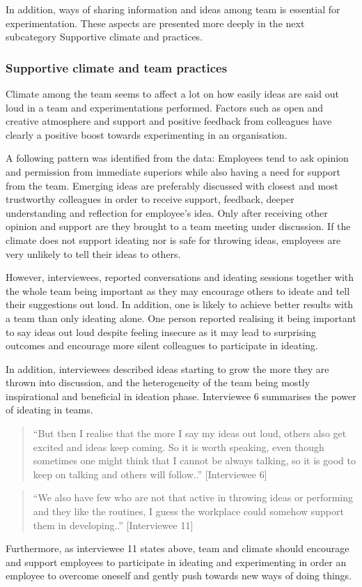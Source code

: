 In addition, ways of sharing information and ideas among team is essential for experimentation. These aspects are presented more deeply in the next subcategory Supportive climate and practices. 


\subsubsection{Supportive climate and team practices}
Climate among the team seems to affect a lot on how easily ideas are said out loud in a team and experimentations performed. Factors such as open and creative atmosphere and support and positive feedback from colleagues have clearly a positive boost towards experimenting in an organisation.

A following pattern was identified from the data: Employees tend to ask opinion and permission from immediate superiors while also having a need for support from the team. Emerging ideas are preferably discussed with closest and most trustworthy colleagues in order to receive support, feedback, deeper understanding and reflection for employee's idea. Only after receiving other opinion and support are they brought to a team meeting under discussion. If the climate does not support ideating nor is safe for throwing ideas, employees are very unlikely to tell their ideas to others. 

However, interviewees, reported conversations and ideating sessions together with the whole team being important as they may encourage others to ideate and tell their suggestions out loud. In addition, one is likely to achieve better results with a team than only ideating alone. One person reported realising it being important to say ideas out loud despite feeling insecure as it may lead to surprising outcomes and encourage more silent colleagues to participate in ideating. 

In addition, interviewees described ideas starting to grow the more they are thrown into discussion, and the heterogeneity of the team being mostly inspirational and beneficial in ideation phase. Interviewee 6 summarises the power of ideating in teams. 
\begin{quote}
``But then I realise that the more I say my ideas out loud, others also get excited and ideas keep coming. So it is worth speaking, even though sometimes one might think that I cannot be always talking, so it is good to keep on talking and others will follow..'' [Interviewee 6]
\end{quote}
\begin{quote}
``We also have few who are not that active in throwing ideas or performing and they like the routines, I guess the workplace could somehow support them in developing..'' [Interviewee 11]
\end{quote}
Furthermore, as interviewee 11 states above, team and climate should encourage and support employees to participate in ideating and experimenting in order an employee to overcome oneself and gently push towards new ways of doing things. 

